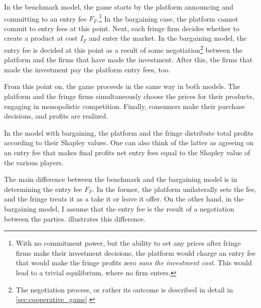 \documentclass[a4paper]{article}
\begin{document}
In the benchmark model, the game starts by the platform announcing and committing to an entry fee $F_F$.\footnote{
    With no commitment power, but the ability to set any prices after fringe firms make their investment decisions, the platform would charge an entry fee that would make the fringe profits zero \emph{sans the investment cost}.
    This would lead to a trivial equilibrium, where no firm enters.
}
In the bargaining case, the platform cannot commit to entry fees at this point.
Next, each fringe firm decides whether to create a product at cost $I_F$ and enter the market.
In the bargaining model, the entry fee is decided at this point as a result of some negotiation\footnote{
    The negotiation process, or rather its outcome is described in detail in \cref{sec:cooperative_game}.
} between the platform and the firms that have made the investment.
After this, the firms that made the investment pay the platform entry fees, too.

From this point on, the game proceeds in the same way in both models.
The platform and the fringe firms simultaneously choose the prices for their products, engaging in monopolistic competition.
Finally, consumers make their purchase decisions, and profits are realized.

In the model with bargaining, the platform and the fringe distribute total profits according to their Shapley values.
One can also think of the latter as agreeing on an entry fee that makes final profits net entry fees equal to the Shapley value of the various players.

The main difference between the benchmark and the bargaining model is in determining the entry fee $F_F$.
In the former, the platform unilaterally sets the fee, and the fringe treats it as a take it or leave it offer.
On the other hand, in the bargaining model, I assume that the entry fee is the result of a negotiation between the parties.
 illustrates this difference.
\end{document}

